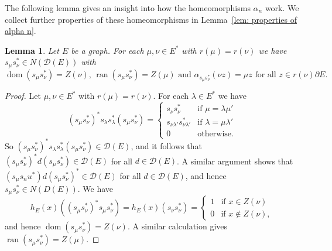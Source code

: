 \documentclass[12pt, a4paper]{amsart}
\numberwithin{equation}{section}
\newtheorem{lemma}[thm]{Lemma}
\theoremstyle{definition}
\theoremstyle{remark}
\begin{document}
The following lemma gives an insight into how the homeomorphisms $\alpha_n$ 
work. We 
collect further properties of these homeomorphisms in Lemma~\ref{lem: 
properties of alpha n}.

\begin{lemma}\label{lem: alpha sub spanning elt }
Let $E$ be a graph. For each $\mu,\nu\in E^*$ with $r(\mu)=r(\nu)$ we have 
$s_{\mu}s_\nu^*\in N({\mathcal{D}}(E))$ with
\[
{{\operatorname{dom}}}(s_\mu s_\nu^*)=Z(\nu),\,{{\operatorname{ran}}}(s_\mu 
s_\nu^*)=Z(\mu)\text{ and }\alpha_{s_\mu s_\nu^*}(\nu z)=\mu z\text{ 
for all $z\in 
r(\nu)\partial E$.}
\]
\end{lemma}

\begin{proof}
Let $\mu,\nu\in E^*$ with $r(\mu)=r(\nu)$. For each $\lambda\in E^*$ we have
\begin{equation}\label{eq: key s mu s nu star normaliser}
(s_\mu s_\nu^*)^*s_\lambda s_\lambda^*(s_\mu s_\nu ^*) =
\begin{cases}
s_\nu s_\nu^* & \text{if $\mu=\lambda\mu'$}\\
s_{\nu\lambda'}s_{\nu\lambda'}^* & \text{if $\lambda=\mu\lambda'$}\\
0 & \text{otherwise.}
\end{cases}
\end{equation}
So $(s_\mu s_\nu^*)^*s_\lambda s_\lambda^*(s_\mu s_\nu ^*)\in{\mathcal{D}}(E)$, and it 
follows that $(s_\mu s_\nu^*)^*d(s_\mu s_\nu ^*)\in{\mathcal{D}}(E)$ for all 
$d\in{\mathcal{D}}(E)$. A similar argument shows that $(s_\mu s_nu^*)d(s_\mu s_\nu 
^*)^*\in{\mathcal{D}}(E)$ for all $d\in{\mathcal{D}}(E)$, and hence $s_\mu s_\nu^*\in N(D(E))$. We 
have
\[
h_E(x)((s_\mu s_{\nu}^*)^*s_\mu s_\nu^*)=h_E(x)(s_\nu s_\nu^*)=
\begin{cases}
1 & \text{if $x\in Z(\nu)$}\\
0 & \text{if $x\not\in Z(\nu)$},
\end{cases}
\]
and hence ${{\operatorname{dom}}}(s_\mu s_\nu^*)=Z(\nu)$. A similar calculation gives 
${{\operatorname{ran}}}(s_\mu s_\nu^*)=Z(\mu)$. 


\end{proof}
\end{document}
